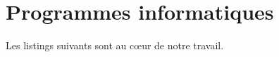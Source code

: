 \chapter{Programmes informatiques}
\label{chap-listings}

Les listings suivants sont au cœur de notre travail.



